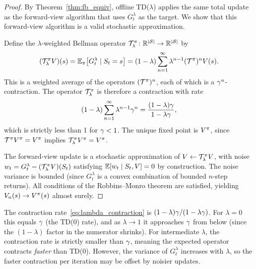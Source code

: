 \documentclass[11pt,a4paper]{article}
\begin{document}
\begin{proof}
By Theorem~\ref{thm:fb_equiv}, offline TD($\lambda$) applies the
same total update as the forward-view algorithm that uses
$G_t^\lambda$ as the target. We show that this forward-view algorithm
is a valid stochastic approximation.

Define the $\lambda$-weighted Bellman operator
$\mathcal{T}_\lambda^\pi \colon \mathbb{R}^{|\mathcal{S}|} \to \mathbb{R}^{|\mathcal{S}|}$ by
\begin{equation}
  (\mathcal{T}_\lambda^\pi V)(s)
  = \mathbb{E}_\pi\bigl[G_t^\lambda \mid S_t = s\bigr]
  = (1 - \lambda) \sum_{n=1}^{\infty} \lambda^{n-1}
    (\mathcal{T}^\pi)^n V(s).
  \label{eq:lambda_operator}
\end{equation}
This is a weighted average of the operators
$(\mathcal{T}^\pi)^n$, each of which is a $\gamma^n$-contraction.
The operator $\mathcal{T}_\lambda^\pi$ is therefore a contraction
with rate
\begin{equation}
  (1 - \lambda) \sum_{n=1}^{\infty} \lambda^{n-1} \gamma^n
  = \frac{(1-\lambda)\gamma}{1 - \lambda\gamma},
  \label{eq:lambda_contraction}
\end{equation}
which is strictly less than 1 for $\gamma < 1$.
The unique fixed point is $V^{\pi}$, since
$\mathcal{T}^\pi V^{\pi} = V^{\pi}$ implies
$\mathcal{T}_\lambda^\pi V^{\pi} = V^{\pi}$.

The forward-view update is a stochastic approximation of
$V \leftarrow \mathcal{T}_\lambda^\pi V$, with noise
$w_t = G_t^\lambda - (\mathcal{T}_\lambda^\pi V)(S_t)$ satisfying
$\mathbb{E}[w_t \mid S_t, V] = 0$ by construction. The noise variance is
bounded (since $G_t^\lambda$ is a convex combination of bounded
$n$-step returns). All conditions of the Robbins--Monro theorem
are satisfied, yielding $V_n(s) \to V^{\pi}(s)$ almost surely.
\end{proof}

\begin{remark}
\label{rem:contraction_rate}
The contraction rate~\eqref{eq:lambda_contraction} is
$(1 - \lambda)\gamma/(1 - \lambda\gamma)$. For $\lambda = 0$
this equals $\gamma$ (the TD(0) rate), and as $\lambda \to 1$ it
approaches $\gamma$ from below (since the $(1-\lambda)$ factor in
the numerator shrinks). For intermediate $\lambda$, the contraction
rate is strictly smaller than $\gamma$, meaning the expected
operator contracts \emph{faster} than TD(0). However, the variance
of $G_t^\lambda$ increases with $\lambda$, so the faster contraction
per iteration may be offset by noisier updates.
\end{remark}
\end{document}
